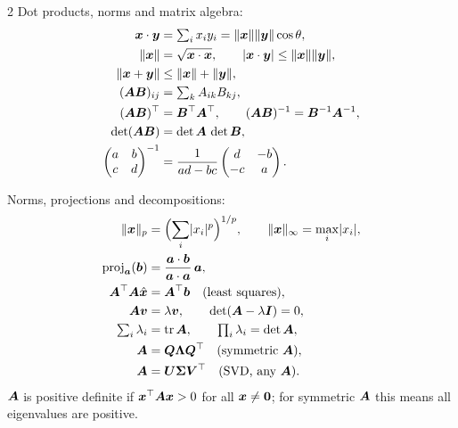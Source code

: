 \begin{multicols}{2}
Dot products, norms and matrix algebra:
\begin{align*}
  \bm{x}\cdot\bm{y} &= \textstyle\sum_ix_iy_i = \lVert\bm{x}\rVert\lVert\bm{y}\rVert\cos\theta,\\
  \lVert\bm{x}\rVert &= \sqrt{\bm{x}\cdot\bm{x}}, \qquad \lvert\bm{x}\cdot\bm{y}\rvert \le \lVert\bm{x}\rVert\lVert\bm{y}\rVert,\\
  \lVert\bm{x} + \bm{y}\rVert &\le \lVert\bm{x}\rVert + \lVert\bm{y}\rVert,\\
  (\bm{A}\bm{B})_{ij} &= \textstyle\sum_kA_{ik}B_{kj},\\
  (\bm{A}\bm{B})^\top &= \bm{B}^\top\bm{A}^\top, \qquad (\bm{A}\bm{B})^{-1} = \bm{B}^{-1}\bm{A}^{-1},\\
  \det(\bm{A}\bm{B}) &= \det\bm{A}\,\det\bm{B},\\
  \begin{pmatrix} a & b\\ c & d\end{pmatrix}^{-1}
    &= \frac{1}{ad - bc}\begin{pmatrix} d & -b\\ -c & a\end{pmatrix}.
\end{align*}

Norms, projections and decompositions:
\begin{align*}
  \lVert\bm{x}\rVert_p &= \Bigl(\sum_i\lvert x_i\rvert^p\Bigr)^{1/p}, \qquad
    \lVert\bm{x}\rVert_\infty = \max_i\lvert x_i\rvert,\\
  \operatorname{proj}_{\bm{a}}(\bm{b}) &= \frac{\bm{a}\cdot\bm{b}}{\bm{a}\cdot\bm{a}}\,\bm{a},\\
  \bm{A}^\top\bm{A}\hat{\bm{x}} &= \bm{A}^\top\bm{b} \quad\text{(least squares)},\\
  \bm{A}\bm{v} &= \lambda\bm{v}, \qquad \det(\bm{A} - \lambda\bm{I}) = 0,\\
  \textstyle\sum_i\lambda_i &= \operatorname{tr}\bm{A}, \qquad \textstyle\prod_i\lambda_i = \det\bm{A},\\
  \bm{A} &= \bm{Q}\bm{\Lambda}\bm{Q}^\top \quad\text{(symmetric } \bm{A}\text{)},\\
  \bm{A} &= \bm{U}\bm{\Sigma}\bm{V}^\top \quad\text{(SVD, any } \bm{A}\text{)}.
\end{align*}
$\bm{A}$ is positive definite if $\bm{x}^\top\bm{A}\bm{x} > 0$ for all $\bm{x} \neq \bm{0}$; for
symmetric $\bm{A}$ this means all eigenvalues are positive.


\end{multicols}
